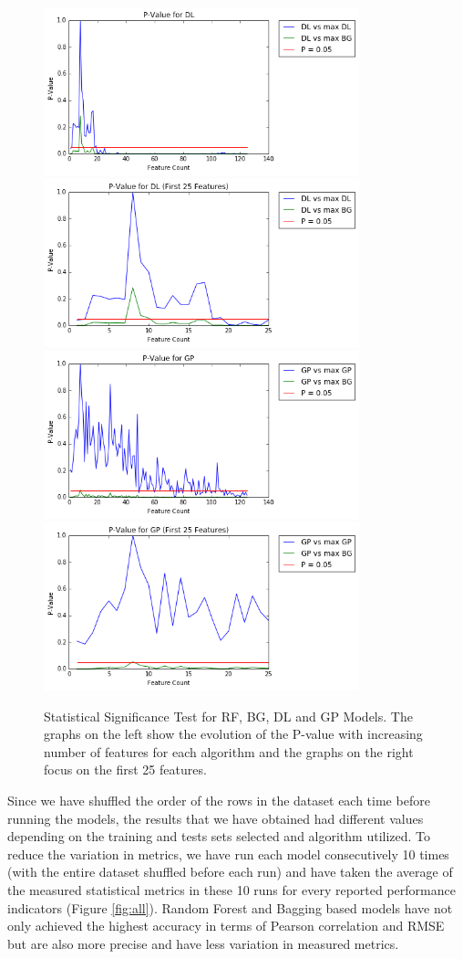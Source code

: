 \documentclass[journal]{IEEEtran}
\begin{document}
\begin{figure}[ht!]
\includegraphics[width=3.6in]{./pdl.png}
\includegraphics[width=3.6in]{./pdlzoom.png}
\includegraphics[width=3.6in]{./pgp.png}
\includegraphics[width=3.6in]{./pgpzoom.png}

\caption{Statistical Significance Test for RF, BG, DL and GP Models. The graphs on the left show the evolution of the P-value with increasing number of features for each algorithm and the graphs on the right focus on the first 25 features.}
\label{fig:stats}
\vspace{-0.3cm}
\end{figure}

Since we have shuffled the order of the rows in the dataset each time before running the models, the results that we have obtained had different values depending on the training and tests sets selected and algorithm utilized. To reduce the variation in metrics, we have run each model consecutively 10 times (with the entire dataset shuffled before each run) and have taken the average of the measured statistical metrics in these 10 runs for every reported performance indicators (Figure \ref{fig:all}). Random Forest and Bagging based models have not only achieved the highest accuracy in terms of Pearson correlation and RMSE but are also more precise and have less variation in measured metrics.
\end{document}
